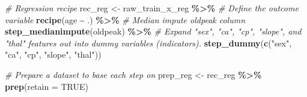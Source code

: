 \documentclass[
]{book}
\newenvironment{Shaded}{\begin{snugshade}}{\end{snugshade}}
\newcommand{\CommentTok}[1]{\textcolor[rgb]{0.56,0.35,0.01}{\textit{#1}}}
\newcommand{\DataTypeTok}[1]{\textcolor[rgb]{0.13,0.29,0.53}{#1}}
\newcommand{\KeywordTok}[1]{\textcolor[rgb]{0.13,0.29,0.53}{\textbf{#1}}}
\newcommand{\NormalTok}[1]{#1}
\newcommand{\OperatorTok}[1]{\textcolor[rgb]{0.81,0.36,0.00}{\textbf{#1}}}
\newcommand{\OtherTok}[1]{\textcolor[rgb]{0.56,0.35,0.01}{#1}}
\newcommand{\StringTok}[1]{\textcolor[rgb]{0.31,0.60,0.02}{#1}}
\begin{document}
\begin{Shaded}
\begin{Highlighting}[]
\CommentTok{\# Regression recipe }
\NormalTok{rec\_reg \textless{}{-}}\StringTok{ }\NormalTok{raw\_train\_x\_reg }\OperatorTok{\%\textgreater{}\%}
\StringTok{  }\CommentTok{\# Define the outcome variable }
\StringTok{  }\KeywordTok{recipe}\NormalTok{(age }\OperatorTok{\textasciitilde{}}\StringTok{ }\NormalTok{.) }\OperatorTok{\%\textgreater{}\%}
\StringTok{  }\CommentTok{\# Median impute oldpeak column }
\StringTok{  }\KeywordTok{step\_medianimpute}\NormalTok{(oldpeak) }\OperatorTok{\%\textgreater{}\%}
\StringTok{  }\CommentTok{\# Expand "sex", "ca", "cp", "slope", and "thal" features out into dummy variables (indicators). }
\StringTok{  }\KeywordTok{step\_dummy}\NormalTok{(}\KeywordTok{c}\NormalTok{(}\StringTok{"sex"}\NormalTok{, }\StringTok{"ca"}\NormalTok{, }\StringTok{"cp"}\NormalTok{, }\StringTok{"slope"}\NormalTok{, }\StringTok{"thal"}\NormalTok{))}

\CommentTok{\# Prepare a dataset to base each step on}
\NormalTok{prep\_reg \textless{}{-}}\StringTok{ }\NormalTok{rec\_reg }\OperatorTok{\%\textgreater{}\%}\StringTok{ }\KeywordTok{prep}\NormalTok{(}\DataTypeTok{retain =} \OtherTok{TRUE}\NormalTok{) }
\end{Highlighting}
\end{Shaded}

\begin{Shaded}
\end{Shaded}
\end{document}
